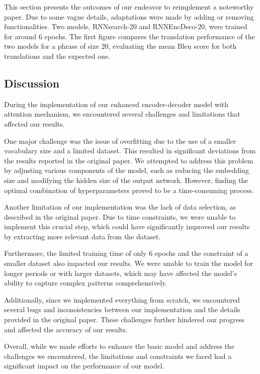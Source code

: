 This section presents the outcomes of our endeavor to reimplement a noteworthy paper. Due to some vague details, adaptations were made by adding or removing functionalities. Two models, RNNsearch-20 and RNNEncDeco-20, were trained for around 6 epochs. The first figure compares the translation performance of the two models for a phrase of size 20, evaluating the mean Bleu score for both translations and the expected one.

\subsection{Discussion}

During the implementation of our enhanced encoder-decoder model with attention mechanism, we encountered several challenges and limitations that affected our results.

One major challenge was the issue of overfitting due to the use of a smaller vocabulary size and a limited dataset. This resulted in significant deviations from the results reported in the original paper. We attempted to address this problem by adjusting various components of the model, such as reducing the embedding size and modifying the hidden size of the output network. However, finding the optimal combination of hyperparameters proved to be a time-consuming process.

Another limitation of our implementation was the lack of data selection, as described in the original paper. Due to time constraints, we were unable to implement this crucial step, which could have significantly improved our results by extracting more relevant data from the dataset.

Furthermore, the limited training time of only 6 epochs and the constraint of a smaller dataset also impacted our results. We were unable to train the model for longer periods or with larger datasets, which may have affected the model's ability to capture complex patterns comprehensively.

Additionally, since we implemented everything from scratch, we encountered several bugs and inconsistencies between our implementation and the details provided in the original paper. These challenges further hindered our progress and affected the accuracy of our results.

Overall, while we made efforts to enhance the basic model and address the challenges we encountered, the limitations and constraints we faced had a significant impact on the performance of our model.
